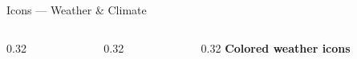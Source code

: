 \documentclass[presentation, aspectratio=169]{beamer}
\begin{document}
\begin{frame}{Icons --- Weather \& Climate}
  \begin{columns}[t, onlytextwidth]
    \begin{column}{0.32\textwidth}
      \\[0.2em]
      \\[0.2em]
      \\[0.2em]
      \\[0.2em]
      \\[0.2em]
    \end{column}
    \begin{column}{0.32\textwidth}
      \\[0.2em]
      \\[0.2em]
      \\[0.2em]
      \\[0.2em]
      \\[0.2em]
    \end{column}
    \begin{column}{0.32\textwidth}
      \textbf{Colored weather icons}\\[0.4em]
      \textcolor{yellow}{}\\[0.2em]
      \textcolor{cyan}{}\\[0.2em]
      \textcolor{blue}{}\\[0.2em]
      \textcolor{orange}{}\\[0.2em]
      \textcolor{petrol}{}\\[0.2em]
      \textcolor{red}{}
    \end{column}
  \end{columns}
\end{frame}
\end{document}
